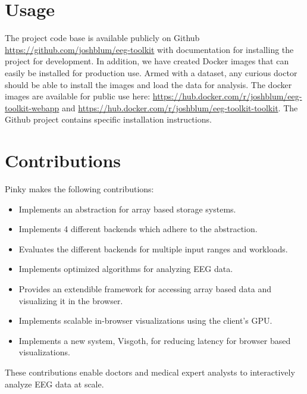 \section{Usage}

The project code base is available publicly on Github \cite{github}
\url{https://github.com/joshblum/eeg-toolkit} with documentation for installing
the project for development. In addition, we have created Docker \cite{docker}
images that can easily be installed for production use. Armed with a dataset, any
curious doctor should be able to install the images and load the data for
analysis. The docker images are available for public use here:
\url{https://hub.docker.com/r/joshblum/eeg-toolkit-webapp} and
\url{https://hub.docker.com/r/joshblum/eeg-toolkit-toolkit}. The Github project
contains specific installation instructions.

\section{Contributions}

Pinky makes the following contributions:

\begin{itemize}

  \item Implements an abstraction for array based storage systems.

  \item Implements 4 different backends which adhere to the abstraction.

  \item Evaluates the different backends for multiple input ranges and
    workloads.

  \item Implements optimized algorithms for analyzing EEG data.

  \item Provides an extendible framework for accessing array based data and
    visualizing it in the browser.

  \item Implements scalable in-browser visualizations using the client's GPU.

  \item Implements a new system, Visgoth, for reducing latency for browser
    based visualizations.

\end{itemize}

These contributions enable doctors and medical expert analysts to interactively
analyze EEG data at scale.

